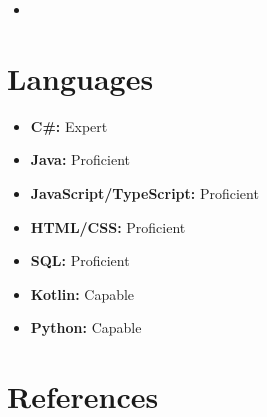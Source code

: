 \documentclass[11pt,a4paper,sans]{moderncv}
\begin{document}
\begin{itemize}

\item{}

\end{itemize}

\vspace{2pt}

\section{Languages}

\vspace{1pt}

\begin{itemize}

\item \textbf{C\#:} Expert 

\vspace{1pt}

\item \textbf{Java:} Proficient 

\vspace{1pt}

\item \textbf{JavaScript/TypeScript:} Proficient 

\vspace{1pt}

\item \textbf{HTML/CSS:} Proficient 

\vspace{1pt}

\item \textbf{SQL:} Proficient 

\vspace{1pt}

\item \textbf{Kotlin:} Capable 

\vspace{1pt}

\item \textbf{Python:} Capable 

\end{itemize}

\section{References}
\end{document}
